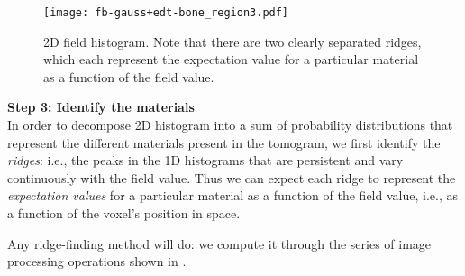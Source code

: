 \begin{figure}
    \texttt{[image: fb-gauss+edt-bone\_region3.pdf]}
    \caption{2D field histogram. Note that there are two clearly separated ridges, which each represent
      the expectation value for a particular material as a function of the field value.}
    \label{fig:field-hist}
\end{figure}

\vspace{\baselineskip}
\noindent\textbf{Step 3: Identify the materials} \\
In order to decompose 2D histogram into a sum of probability distributions that represent
the different materials present in the tomogram, we first identify the {\em ridges}:
i.e., the peaks in the 1D histograms that are persistent and vary continuously with the field value.
Thus we can expect each ridge to represent the {\em expectation values} for a particular material
as a function of the field value, i.e., as a function of the voxel's position in space.

Any ridge-finding method will do: we compute it through the series of image processing operations shown in
.



